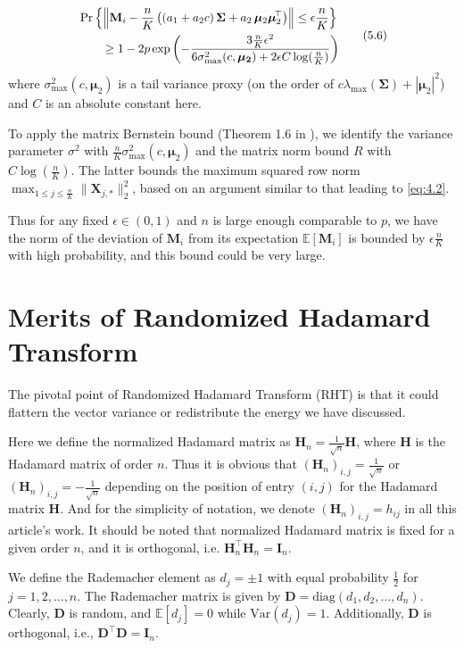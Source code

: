 \documentclass[11pt]{article}
\numberwithin{equation}{section}
\theoremstyle{plain}
\theoremstyle{definition}
\theoremstyle{remark}
\begin{document}
\[
\scalebox{0.95}{$
\begin{aligned}
&\Pr\left\{\left\lVert \mathbf{M}_{i}-\frac{n}{K}\left((a_{1}+a_{2}c)\,\mathbf{\Sigma} + a_{2}\,\boldsymbol{\mu}_{2}\boldsymbol{\mu}_{2}^{\!\top}\right)\right\rVert \leq \epsilon\frac{n}{K}\right\} \\
&\qquad \geq 1 - 2p\exp\left(-\frac{3\frac{n}{K}\epsilon^{2}}{6\sigma_{\max}^{2}(c,\boldsymbol{\mu_2})+2\epsilon C\log(\frac{n}{K})}\right)
\end{aligned}\tag{5.6}\label{eq:5.6}
$}
\]
where $\sigma_{\max}^2(c,\boldsymbol\mu_2)$ is a tail variance proxy (on the order of $c\lambda_{\max}(\mathbf{\Sigma}) + |\boldsymbol\mu_2|^2$) and $C$ is an absolute constant here.

To apply the matrix Bernstein bound (Theorem 1.6 in \cite{Tropp_2011}), we identify the variance parameter $\sigma^2$ with $\frac{n}{K}\sigma_{\max}^2(c,\boldsymbol\mu_2)$ and the matrix norm bound $R$ with $C\log(\frac{n}{K})$. The latter bounds the maximum squared row norm $\max_{1 \le j \le \frac{n}{K}} \|\mathbf{X}_{j,\ast}\|_2^2$, based on an argument similar to that leading to \ref{eq:4.2}.

Thus for any fixed $\epsilon\in(0,1)$ and $n$ is large enough comparable to $p$, we have the norm of the deviation of $\mathbf{M}_{i}$ from its expectation $\mathbb{E}[\mathbf{M}_{i}]$ is bounded by $\epsilon\frac{n}{K}$ with high probability, and this bound could be very large.
\section{Merits of Randomized Hadamard Transform}

The pivotal point of Randomized Hadamard Transform (RHT) is that it could flattern the vector variance or redistribute the energy we have discussed.

Here we define the normalized Hadamard matrix as $\mathbf{H}_n = \frac{1}{\sqrt{n}}\mathbf{H}$, where $\mathbf{H}$ is the Hadamard matrix of order $n$.
Thus it is obvious that $(\mathbf{H}_n)_{i,j} = \frac{1}{\sqrt{n}}$ or $(\mathbf{H}_n)_{i,j} = -\frac{1}{\sqrt{n}}$ depending on the position of entry $(i,j)$ for the Hadamard matrix $\mathbf{H}$.
And for the simplicity of notation, we denote $(\mathbf{H}_n)_{i,j}=h_{ij}$ in all this article's work.
It should be noted that normalized Hadamard matrix is fixed for a given order $n$, and it is orthogonal, i.e. $\mathbf{H}_n^{\top}\mathbf{H}_n = \mathbf{I}_n$.


We define the Rademacher element as $d_j = \pm 1$ with equal probability $\frac{1}{2}$ for $j = 1, 2, \ldots, n$. The Rademacher matrix is given by $\mathbf{D} = \text{diag}(d_1, d_2, \ldots, d_n)$. Clearly, $\mathbf{D}$ is random, and $\mathbb{E}[d_j] = 0$ while $\text{Var}(d_j) = 1$. Additionally, $\mathbf{D}$ is orthogonal, i.e., $\mathbf{D}^{\top}\mathbf{D} = \mathbf{I}_{n}$.
\end{document}
